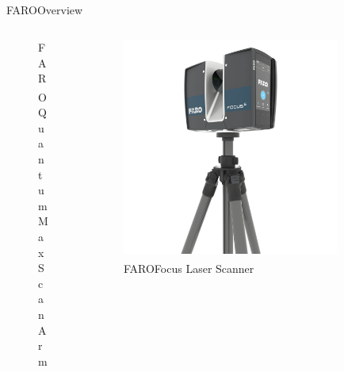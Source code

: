 \documentclass[10pt]{beamer}
\newcommand{\faro}[0]{FARO\textsuperscript{\textregistered}\space}
\begin{document}
\begin{frame}{\faro Overview}
\begin{columns}
\begin{column}{0.30\textwidth}
\begin{figure}
          \caption*{\faro Quantum Max \newline Scan Arm}
        \end{figure}
      \end{column}
      \begin{column}{0.30\textwidth}
        \begin{figure}
          \centering
          \includegraphics[width=\textwidth]{images/faro_scanner.jpg}
          \caption*{\faro Focus \newline Laser Scanner}
        \end{figure}
      \end{column}
      \begin{column}{0.30\textwidth}
        \begin{figure}
          \centering

\end{figure}
\end{column}
\end{columns}
\end{frame}
\end{document}
